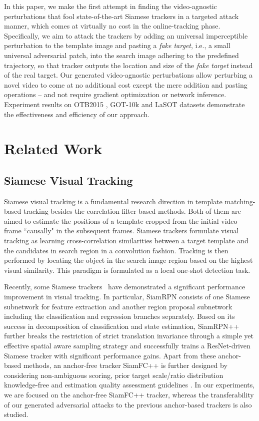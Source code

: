 \documentclass{article}
\newcommand{\ie}{i.e.}
\begin{document}
In this paper, we make the first attempt in finding the video-agnostic perturbations that fool state-of-the-art Siamese trackers in a targeted attack manner, which comes at virtually no cost in the online-tracking phase. Specifically, we aim to attack the trackers by adding an universal imperceptible perturbation to the template image and pasting a \textit{fake target}, \ie, a small universal adversarial patch, into the search image adhering to the predefined trajectory, so that tracker outputs the location and size of the \textit{fake target} instead of the real target. Our generated video-agnostic perturbations allow perturbing a novel video to come at no additional cost except the mere addition and pasting operations -- and not require gradient optimization or network inference. Experiment results on OTB2015 \cite{OTB}, GOT-10k \cite{GOT-10k} and LaSOT \cite{GOT-10k} datasets demonstrate the effectiveness and efficiency of our approach.

\section{Related Work}

\subsection{Siamese Visual Tracking}

Siamese visual tracking is a fundamental research direction in template matching-based tracking besides the correlation filter-based methods. Both of them are aimed to estimate the positions of a template cropped from the initial video frame ``causally" in the subsequent frames. Siamese trackers formulate visual tracking as learning cross-correlation similarities between a target template and the candidates in search region in a convolution fashion. Tracking is then performed by locating the object in the search image region based on the highest visual similarity. This paradigm is  formulated as a local one-shot detection task.

Recently, some Siamese trackers~\cite{SiamRPN,SiamRPN++,SiamFC++} have demonstrated a significant performance improvement in visual tracking. 
In particular, SiamRPN \cite{SiamRPN} consists of one Siamese subnetwork for feature extraction and another region proposal subnetwork including the classification and regression branches separately. Based on its success in decomposition of classification and state estimation, SiamRPN++ \cite{SiamRPN++} further breaks the restriction of strict translation invariance through a simple yet effective spatial aware sampling strategy and successfully trains a ResNet-driven Siamese tracker with significant performance gains. Apart from these anchor-based methods, an anchor-free tracker SiamFC++ \cite{SiamFC++} is further designed by considering non-ambiguous scoring, prior target scale/ratio distribution knowledge-free and estimation quality assessment guidelines .
In our experiments, we are focused on the anchor-free SiamFC++ tracker, whereas the transferability of our generated adversarial attacks to the previous anchor-based trackers is also studied.
\end{document}
